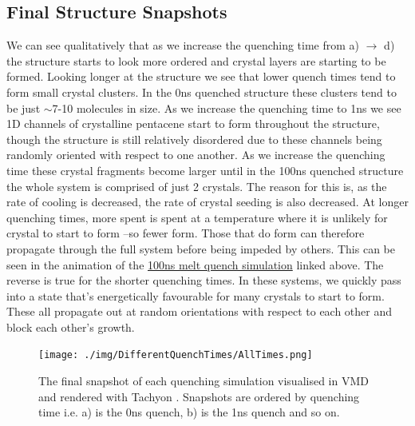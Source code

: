 \subsection{Final Structure Snapshots}
\noindent We can see qualitatively that as we increase the quenching time from a) $\rightarrow$ d) the structure starts to look more ordered and crystal layers are starting to be formed. Looking longer at the structure we see that lower quench times tend to form small crystal clusters. In the 0ns quenched structure these clusters tend to be just $\sim$7-10 molecules in size. As we increase the quenching time to 1ns we see 1D channels of crystalline pentacene start to form throughout the structure, though the structure is still relatively disordered due to these channels being randomly oriented with respect to one another. As we increase the quenching time these crystal fragments become larger until in the 100ns quenched structure the whole system is comprised of just 2 crystals. The reason for this is, as the rate of cooling is decreased, the rate of crystal seeding is also decreased. At longer quenching times, more spent is spent at a temperature where it is unlikely for crystal to start to form --so fewer form. Those that do form can therefore propagate through the full system before being impeded by others. This can be seen in the animation of the \href{https://youtu.be/6IQcYErQHVs}{100ns melt quench simulation} linked above. The reverse is true for the shorter quenching times. In these systems, we quickly pass into a state that's energetically favourable for many crystals to start to form. These all propagate out at random orientations with respect to each other and block each other's growth.

\begin{figure}[ht]
	\texttt{[image: ./img/DifferentQuenchTimes/AllTimes.png]}
	\caption{\label{fig:final_snapshots}The final snapshot of each quenching simulation visualised in VMD \cite{VMD} and rendered with Tachyon \cite{Tachyon}. Snapshots are ordered by quenching time i.e. a) is the 0ns quench, b) is the 1ns quench and so on.}
\end{figure}
